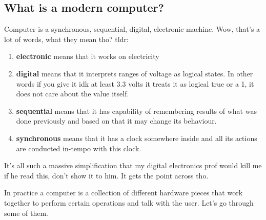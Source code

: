 \documentclass[../ops.tex]{subfiles}
\begin{document}
        \subsection{What is a modern computer?}
        Computer is a synchronous, sequential, digital, electronic machine. Wow,
        that's a lot of words, what they mean tho? tldr:
        \begin{enumerate}
                \item {\bf electronic} means that it works on electricity
                \item {\bf digital} means that it interprets ranges of voltage
                        as logical states. In other words if you give it idk at
                        least 3.3 volts it treats it as logical true or a 1, it
                        does not care about the value itself.
                \item {\bf sequential} means that it has capability of
                        remembering results of what was done previously and
                        based on that it may change its behaviour.
                \item {\bf synchronous} means that it has a clock somewhere
                        inside and all its actions are conducted in-tempo with
                        this clock.
        \end{enumerate}
        It's all such a massive simplification that my digital electronics prof
        would kill me if he read this, don't show it to him. It gets the point
        across tho.

        In practice a computer is a collection of different hardware pieces that
        work together to perform certain operations and talk with the user.
        Let's go through some of them.
\end{document}
